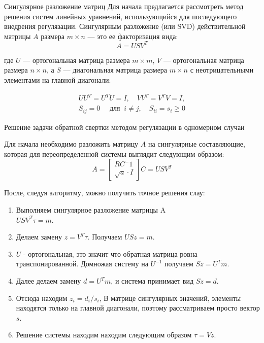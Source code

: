 \documentclass[fullscreen=true,russian,compress,%
	hyperref={unicode,bookmarks=false}]{presentation}
\begin{document}
\begin{frame}{Сингулярное разложение матриц}
   Для начала предлагается рассмотреть метод решения систем линейных уравнений, использующийся для последующего внедрения регулязации.
   Сингулярным разложение (или SVD) действительной матрицы $A$ размера $m \times n$ — это ее факторизация вида: 
   \begin{equation}
       A = U S V^T 
       \label{svd_decomp}
   \end{equation}
   
   где $U$ — ортогональная матрица размера $m \times m$, $V$ — ортогональная матрица размера $n \times n$, а $S$ — диагональная матрица размера 
   $m \times n$ с неотрицательными элементами на главной диагонали: 
   
   \begin{equation}
       \begin{array}{l}
           U U^T = U^T U = I, \quad VV ^T = V^T V = I, \\
           S_{ij} = 0 \quad \text{ для } \ i \neq j, \quad S_{ii} = s_{i} \geq 0
       \end{array}
   \end{equation}
\end{frame}

\begin{frame}{Решение задачи обратной свертки методом регулязации в одномерном случаи}

Для начала необходимо разложить матрицу $A$ на сингулярные составляющие, которая для переопределенной системы 
выглядит следующим образом:
\begin{equation}
   A =
   \begin{bmatrix}
      RC^-1 \\
      \sqrt{a} \cdot I
  \end{bmatrix}
  C = USV^{T}
\end{equation}

После, следуя алгоритму, можно получить точное решения слау:

\begin{enumerate}
    \item Выполняем сингулярное разложение матрицы A \\
    $USV^T \tau = m.$
    \item Делаем замену $z = V^T\tau$. Получаем $USz = m.$
    \item $U$ - ортогональная, это значит что обратная матрица ровна транспонированной. Домножая систему на $U^{-1}$ получаем $Sz=U^Tm$.
    \item Далее делаем замену $d=U^Tm$, и система принимает вид $Sz=d$.
    \item Отсюда находим $z_{i} = d_{i} / s_{i}$, В матрице сингулярных значений, элементы находятся только на главной диагонали, 
    поэтому рассматриваем просто вектор $s$.
    \item Решение системы находим находим следующим образом $\tau = Vz$.
\end{enumerate}

\end{frame}
\end{document}
